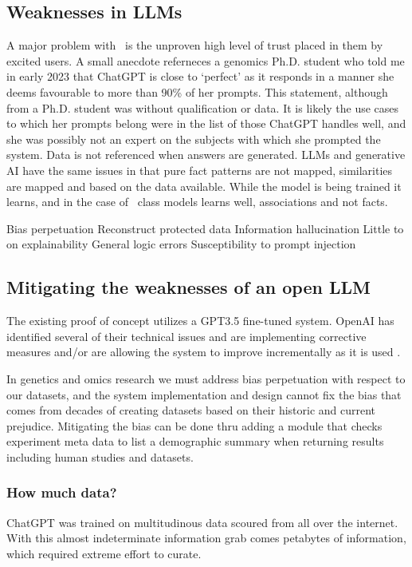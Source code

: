 \subsection{Weaknesses in LLMs}
A major problem with \llms\ is the unproven high level of trust placed in them by excited users.
A small anecdote referneces a genomics Ph.D. student who told me in early 2023 that ChatGPT is close to `perfect' as it responds in a manner she deems favourable to more than 90\% of her prompts.
This statement, although from a Ph.D. student was without qualification or data.
It is likely the use cases to which her prompts belong were in the list of those ChatGPT handles well, and she was possibly not an expert on the subjects with which she prompted the system.
Data is not referenced when answers are generated.
LLMs and generative AI have the same issues in that pure fact patterns are not mapped, similarities are mapped and based on the data available.
While the model is being trained it learns, and in the case of \gpts\ class models learns well, associations and not facts.

Bias perpetuation
Reconstruct protected data
Information hallucination \cite{OpenAI:2023:gpt4}
Little to on explainability
General logic errors
Susceptibility to prompt injection

\subsection{Mitigating the weaknesses of an open LLM}
The existing proof of concept utilizes a GPT3.5 fine-tuned system.
OpenAI has identified several of their technical issues and are implementing corrective measures and/or are allowing the system to improve incrementally as it is used \cite{OpenAI:2023:gpt4}.

In genetics and omics research we must address bias perpetuation with respect to our datasets, and the system implementation and design cannot fix the bias that comes from  decades of creating datasets based on their historic and current prejudice.
Mitigating the bias can be done thru adding a module that checks experiment meta data to list a demographic summary when returning results including human studies and datasets.

\subsubsection{How much data?}
ChatGPT was trained on multitudinous data scoured from all over the internet. 
With this almost indeterminate information grab comes petabytes of information, which required extreme effort to curate.
